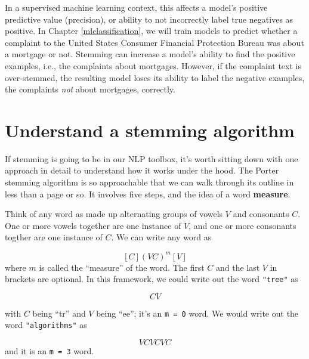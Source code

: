 \documentclass[
]{krantz}
\begin{document}
In a supervised machine learning context, this affects a model's positive predictive value (precision), or ability to not incorrectly label true negatives as positive. In Chapter \ref{mlclassification}, we will train models to predict whether a complaint to the United States Consumer Financial Protection Bureau was about a mortgage or not. Stemming can increase a model's ability to find the positive examples, i.e., the complaints about mortgages. However, if the complaint text is over-stemmed, the resulting model loses its ability to label the negative examples, the complaints \emph{not} about mortgages, correctly.

\hypertarget{understand-a-stemming-algorithm}{%
\section{Understand a stemming algorithm}\label{understand-a-stemming-algorithm}}

If stemming is going to be in our NLP toolbox, it's worth sitting down with one approach in detail to understand how it works under the hood. The Porter stemming algorithm is so approachable that we can walk through its outline in less than a page or so. It involves five steps, and the idea of a word \textbf{measure}.

Think of any word as made up alternating groups of vowels \(V\) and consonants \(C\). One or more vowels together are one instance of \(V\), and one or more consonants togther are one instance of \(C\). We can write any word as

\[[C](VC)^m[V]\]
where \(m\) is called the ``measure'' of the word. The first \(C\) and the last \(V\) in brackets are optional. In this framework, we could write out the word \texttt{"tree"} as

\[CV\]

with \(C\) being ``tr'' and \(V\) being ``ee''; it's an \texttt{m\ =\ 0} word. We would write out the word \texttt{"algorithms"} as

\[VCVCVC\]
and it is an \texttt{m\ =\ 3} word.
\end{document}

